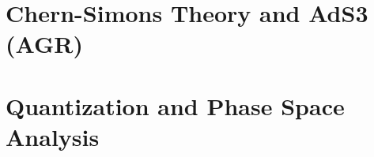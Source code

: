 \documentclass[11pt]{article}
\begin{document}
\newpage
\section{Chern-Simons Theory and AdS3 (AGR)}\label{sec:Chern-Simons Theory
and Gravity (AGR)} %


\newpage
\section{Quantization and Phase Space Analysis}\label{sec:Quantization of 3D
Gravity} %


\newpage
\printbibliography

\todoNoteshow
\end{document}
